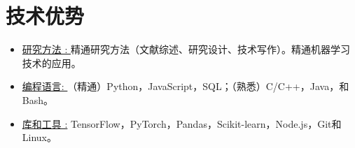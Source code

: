 
\section{\LARGE 技术优势}
\vspace{0.3cm}

\begin{itemize}[leftmargin=.3in]
\setlength\itemsep{.1em}
    \item \underline{研究方法 : } 精通研究方法（文献综述、研究设计、技术写作）。精通机器学习技术的应用。

    \item \underline{编程语言: } （精通）Python，JavaScript，SQL；（熟悉）C/C++，Java，和Bash。
    
    \item \underline{库和工具 :} TensorFlow，PyTorch，Pandas，Scikit-learn，Node.js，Git和Linux。
    


    
\end{itemize}
\vspace{3pt}